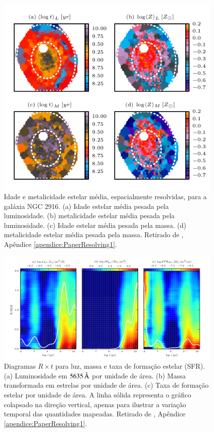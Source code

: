 \begin{figure}
	\includegraphics{figuras/at-aZ-K0277}
	\caption[Idade estelar e metalidade espacialmente resolvidas para a
	galáxia NGC 2916] {Idade e metalicidade estelar média, espacialmente
	resolvidas, para a galáxia NGC 2916. (a) Idade estelar média pesada pela
	luminosidade. (b) metalicidade estelar média pesada pela luminosidade.
	(c) Idade estelar média pesada pela massa. (d) metalicidade estelar
	média pesada pela massa. Retirado de
	\cite[figura 6]{CidFernandes2013}, Apêndice \ref{apendice:PaperResolving1}.}
	\label{fig:ataZMap}
\end{figure}

\begin{figure}
	\includegraphics[width=1.0\columnwidth]{figuras/L-M-SFR-K0277}
	\caption[Diagramas $R \times t$ para luz, massa e SFR] {Diagramas $R \times t$
	para luz, massa e taxa de formação estelar (SFR). (a) Luminosidade em
	$5635\,\text{\normalfont\AA}$ por unidade de área.  (b) Massa transformada em estrelas por
	unidade de área. (c) Taxa de formação estelar por unidade de área. A linha
	sólida representa o gráfico colapsado na direção vertical, apenas para ilustrar
	a variação temporal das quantidades mapeadas. Retirado de
	\cite[figura 12]{CidFernandes2013}, Apêndice \ref{apendice:PaperResolving1}.}
	\label{fig:LMSFR2D}
\end{figure}

